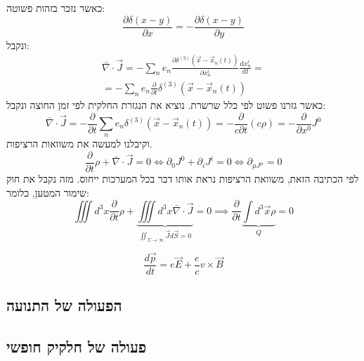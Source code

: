 \documentclass{tstextbook}
\begin{document}
כאשר נזכר בזהות פשוטה:
$$\frac{\partial \delta(x-y)}{\partial x}=-\frac{\partial \delta(x-y)}{\partial y}  $$
ונקבל:
$$\begin{gather}\bar{\nabla} \cdot \vec{J}=-\sum_{n}e_{n}\frac{\partial \delta^{(3)}\left( \vec{x}-\vec{x}_{n}(t) \right)}{\partial x_{n}^i} \frac{\mathrm{d}x_{n}^i}{\mathrm{d}t} = \\= -\sum_{n} e_{n} \frac{\partial }{\partial t} \delta^{(3)}\left( \vec{x}-\vec{x}_{n}(t) \right)
\end{gather}$$
כאשר גזרנו פשוט לפי כלל שרשרת. נוציא את הנגזרת החלקית לפי זמן החוצה ונקבל:
$$\bar{\nabla} \cdot \vec{J}=-\frac{\partial }{\partial t} \sum_{n} e_{n} \delta^{(3)}\left( \vec{x}-\vec{x}_{n}(t) \right) = -\frac{\partial }{c\partial t} \left( c\rho \right)=-\frac{\partial }{\partial x^0} J^0$$
וקיבלנו למעשה את משוואות הרציפות.
$$\frac{\partial }{\partial t} \rho + \bar{\nabla} \cdot \vec{J}=0 \iff \partial_{0}J^0+\partial_{i}J^i =0 \iff \partial_{\mu J^\mu} = 0$$
לפי הכתיבה הזאת, משוואת הרציפות נראת אותו דבר בכל המערכות ייחוס. מזה נקבל את חוק שימור המטען, כלומר:
$$\iiint d^3 x\frac{\partial }{\partial t} \rho + \underbrace{ \iiint d^3 x \bar{\nabla} \cdot \vec{J} }_{ \iint_{\Sigma\to \infty} \vec{J} d\vec{S}=0 }=0 \implies \frac{\partial }{\partial t} \underbrace{ \int d^3 \vec{x} \rho }_{ Q } = 0$$

\begin{theorem}
$${\frac{d{\vec{p}}}{d t}}=e{\vec{E}}+{\frac{e}{c}}v\times{\vec{B}}$$

\end{theorem}
\subsection{הפעולה של התנועה}

\subsection{פעולה של חלקיק חופשי}
\end{document}
